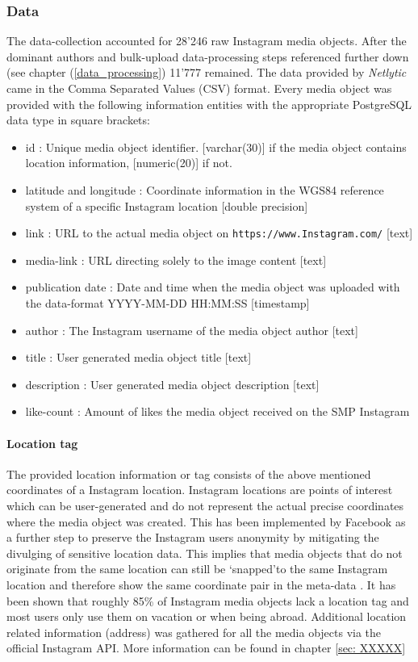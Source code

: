 \subsubsection{Data} \label{Instagram_data}
The data-collection accounted for 28\rq246 raw Instagram media objects. After the dominant authors and bulk-upload data-processing steps referenced further down (see chapter (\ref{data_processing}) 11\rq777 remained.
The data provided by \textit{Netlytic} came in the Comma Separated Values (CSV) format. Every media object was provided with the following information entities with the appropriate PostgreSQL data type in square brackets:
\begin{itemize}
    \item id : Unique media object identifier. [varchar(30)] if the media object contains location information, [numeric(20)] if not.
    \item latitude and longitude : Coordinate information in the WGS84 reference system of a specific Instagram location [double precision]
    \item link : URL to the actual media object on \texttt{https://www.Instagram.com/} [text]
    \item media-link : URL directing solely to the image content [text]
    \item publication date : Date and time when the media object was uploaded with the data-format YYYY-MM-DD HH:MM:SS [timestamp]
    \item author : The Instagram username of the media object author [text]
    \item title : User generated media object title [text]
    \item description : User generated media object description [text] 
    \item like-count : Amount of likes the media object received on the SMP Instagram
\end{itemize}

\paragraph{Location tag}
The provided location information or tag consists of the above mentioned coordinates of a Instagram location. Instagram locations are points of interest which can be user-generated and do not represent the actual precise coordinates where the media object was created. This has been implemented by Facebook as a further step to preserve the Instagram users anonymity by mitigating the divulging of sensitive location data. This implies that media objects that do not originate from the same location can still be \lq snapped\rq to the same Instagram location and therefore show the same coordinate pair in the meta-data \cite{InstagramTags}.
It has been shown that roughly 85\% of Instagram media objects lack a location tag \cite{2018InstagramTags} and most users only use them on vacation or when being abroad.
Additional location related information (address) was gathered for all the media objects via the official Instagram API. More information can be found in chapter \ref{sec: XXXXX}


